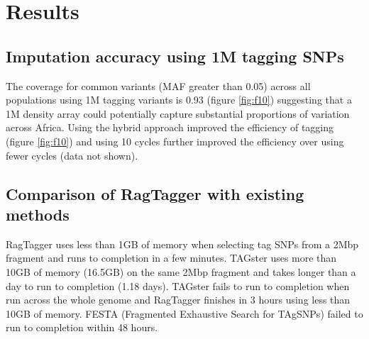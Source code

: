 \section{Results}

\subsection{Imputation accuracy using 1M tagging SNPs}
The coverage for common variants (\gls{MAF} greater than 0.05) across all populations using 1M tagging variants is 0.93 (figure \ref{fig:f10}) suggesting that a 1M density array could potentially capture substantial proportions of variation across Africa. Using the hybrid approach improved the efficiency of tagging (figure \ref{fig:f10}) and using 10 cycles further improved the efficiency over using fewer cycles (data not shown).



\subsection{Comparison of RagTagger with existing methods}
RagTagger uses less than 1GB of memory when selecting tag SNPs from a 2\gls{Mbp} fragment and runs to completion in a few minutes. TAGster\cite{Xu2007} uses more than 10GB of memory (16.5GB) on the same 2\gls{Mbp} fragment and takes longer than a day to run to completion (1.18 days). TAGster fails to run to completion when run across the whole genome and RagTagger finishes in 3 hours using less than 10GB of memory. FESTA (Fragmented Exhaustive Search for TAgSNPs)\cite{Qin15012006} failed to run to completion within 48 hours.